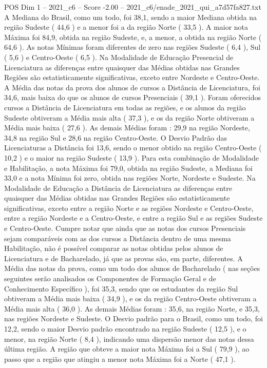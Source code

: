 \begin{textsample}{POS Dim 1 – 2021\_c6 – Score -2.00 – 2021\_c6/enade\_2021\_qui\_a7d57fa827.txt}
A Mediana do Brasil, como um todo, foi 38,1, sendo a maior Mediana obtida na região Sudeste ( 44,6 ) e a menor foi a da região Norte ( 33,5 ).
A maior nota Máxima foi 84,9, obtida na região Sudeste, e, a menor, a obtida na região Norte ( 64,6 ).
As notas Mínimas foram diferentes de zero nas regiões Sudeste ( 6,4 ), Sul ( 5,6 ) e Centro-Oeste ( 6,5 ).
Na Modalidade de Educação Presencial de Licenciatura as diferenças entre quaisquer das Médias obtidas nas Grandes Regiões são estatisticamente significativas, exceto entre Nordeste e Centro-Oeste.
A Média das notas da prova dos alunos de cursos a Distância de Licenciatura, foi 34,6, mais baixa do que os alunos de cursos Presenciais ( 39,1 ).
Foram oferecidos cursos a Distância de Licenciatura em todas as regiões, e os alunos da região Sudeste obtiveram a Média mais alta ( 37,3 ), e os da região Norte obtiveram a Média mais baixa ( 27,6 ).
As demais Médias foram : 29,9 na região Nordeste, 34,8 na região Sul e 28,6 na região Centro-Oeste.
O Desvio Padrão das Licenciaturas a Distância foi 13,6, sendo o menor obtido na região Centro-Oeste ( 10,2 ) e o maior na região Sudeste ( 13,9 ).
Para esta combinação de Modalidade e Habilitação, a nota Máxima foi 79,0, obtida na região Sudeste, a Mediana foi 33,0 e a nota Mínima foi zero, obtida nas regiões Norte, Nordeste e Sudeste.
Na Modalidade de Educação a Distância de Licenciatura as diferenças entre quaisquer das Médias obtidas nas Grandes Regiões são estatisticamente significativas, exceto entre a região Norte e as regiões Nordeste e Centro-Oeste, entre a região Nordeste e a Centro-Oeste, e entre a região Sul e as regiões Sudeste e Centro-Oeste.
Cumpre notar que ainda que as notas dos cursos Presenciais sejam comparáveis com as dos cursos a Distância dentro de uma mesma Habilitação, não é possível comparar as notas obtidas pelos alunos de Licenciatura e de Bacharelado, já que as provas são, em parte, diferentes.
A Média das notas da prova, como um todo dos alunos de Bacharelado ( nas seções seguintes serão analisados os Componentes de Formação Geral e de Conhecimento Específico ), foi 35,3, sendo que os estudantes da região Sul obtiveram a Média mais baixa ( 34,9 ), e os da região Centro-Oeste obtiveram a Média mais alta ( 36,0 ).
As demais Médias foram : 35,6, na região Norte, e 35,3, nas regiões Nordeste e Sudeste.
O Desvio padrão para o Brasil, como um todo, foi 12,2, sendo o maior Desvio padrão encontrado na região Sudeste ( 12,5 ), e o menor, na região Norte ( 8,4 ), indicando uma dispersão menor das notas dessa última região.
A região que obteve a maior nota Máxima foi a Sul ( 79,9 ), ao passo que a região que atingiu a menor nota Máxima foi a Norte ( 47,1 ).

\end{textsample}
